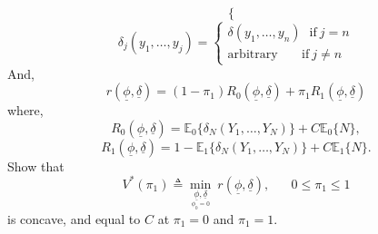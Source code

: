 \documentclass[a4paper,english,12pt]{article}
\begin{document}
\begin{enumerate}
\begin{equation*}
\begin{cases}
\end{cases}
\end{equation*}
\begin{equation*}
\delta_j(y_1,\dots,y_j)=\begin{cases}
\delta(y_1,\dots,y_n)~\hspace{5pt}\mbox{if}~j= n\\
\mbox{arbitrary}~\hspace{20pt}\mbox{if}~j\neq n
\end{cases}
\end{equation*}
And, 
\begin{equation*}
r(\underline{\phi},\underline{\delta})=(1-\pi_1)R_0(\underline{\phi},\underline{\delta})+\pi_1 R_1(\underline{\phi},\underline{\delta})
\end{equation*}
where,
\begin{equation*}
R_0(\underline{\phi},\underline{\delta})=\mathbb{E}_0\{\delta_N(Y_1,\dots,Y_N)\}+C\mathbb{E}_0\{N\},
\end{equation*}
\begin{equation*}
R_1(\underline{\phi},\underline{\delta})=1-\mathbb{E}_1\{\delta_N(Y_1,\dots,Y_N)\}+C\mathbb{E}_1\{N\}.
\end{equation*}
Show that 
\begin{equation*}
V^*(\pi_1) \triangleq \underset{\underset{\phi_0=0}{\underline{\phi},\underline{\delta}}}{\min}~r(\underline{\phi},\underline{\delta}),\hspace{20pt}0\leq \pi_1 \leq 1
\end{equation*}
is concave, and equal to $C$ at $\pi_1=0$ and $\pi_1=1$.

\end{enumerate}
\end{document}
